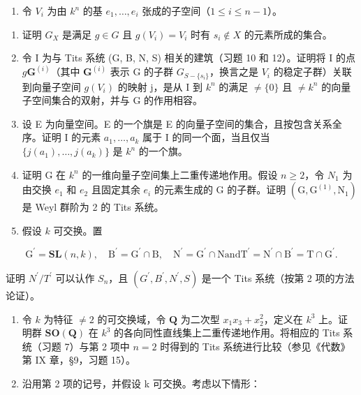 \begin{enumerate}
\def\labelenumi{(\arabic{enumi})}
\setcounter{enumi}{17}
\tightlist
\item
  令 \(V_i\) 为由 \(k^n\) 的基 \(e_1, \ldots, e_i\) 张成的子空间（\(1 \leqslant i \leqslant n - 1\)）。
\end{enumerate}

\begin{enumerate}
\def\labelenumi{\alph{enumi})}
\item
  证明 \(G_{X}\) 是满足 \(g \in G\) 且 \(g(V_{i}) = V_{i}\) 时有 \(s_{i} \notin X\) 的元素所成的集合。
\item
  令 I 为与 Tits 系统 (G, B, N, S) 相关的建筑（习题 10 和 12）。证明将 I 的点 \(g\mathbf{G}^{(i)}\)（其中 \(\mathbf{G}^{(i)}\) 表示 G 的子群 \(G_{S-\{s_i\}}\)，换言之是 \(V_i\) 的稳定子群）关联到向量子空间 \(g(V_i)\) 的映射 j，是从 I 到 \(k^n\) 的满足 \(\neq \{0\}\) 且 \(\neq k^n\) 的向量子空间集合的双射，并与 G 的作用相容。
\item
  设 E 为向量空间。E 的一个旗是 E 的向量子空间的集合，且按包含关系全序。证明 I 的元素 \(a_{1}, \ldots, a_{k}\) 属于 I 的同一个面，当且仅当 \(\{j(a_{1}), \ldots, j(a_{k})\}\) 是 \(k^{n}\) 的一个旗。
\item
  证明 G 在 \(k^{n}\) 的一维向量子空间集上二重传递地作用。假设 \(n \geqslant 2\)，令 \(N_{1}\) 为由交换 \(e_{1}\) 和 \(e_{2}\) 且固定其余 \(e_{i}\) 的元素生成的 G 的子群。证明 \((\mathrm{G}, \mathrm{G}^{(1)}, \mathrm{N}_{1})\) 是 Weyl 群阶为 2 的 Tits 系统。
\item
  假设 \(k\) 可交换。置
\end{enumerate}

\[
\mathrm{G} ^ {\prime} = \mathbf {S L} (n, k), \quad \mathrm{B} ^ {\prime} = \mathrm{G} ^ {\prime} \cap \mathrm{B}, \quad \mathrm{N} ^ {\prime} = \mathrm{G} ^ {\prime} \cap \mathrm{N} \text {and} \mathrm{T} ^ {\prime} = \mathrm{N} ^ {\prime} \cap \mathrm{B} ^ {\prime} = \mathrm{T} \cap \mathrm{G} ^ {\prime}.
\]

证明 \(N^{\prime}/T^{\prime}\) 可以认作 \(S_{n}\)，且 \((G^{\prime}, B^{\prime}, N^{\prime}, S)\) 是一个 Tits 系统（按第 2 项的方法论证）。

\begin{enumerate}
\def\labelenumi{\arabic{enumi})}
\setcounter{enumi}{18}
\item
  令 \(k\) 为特征 \(\neq 2\) 的可交换域，令 \(\mathbf{Q}\) 为二次型 \(x_{1}x_{3} + x_{2}^{2}\)，定义在 \(k^{3}\) 上。证明群 \(\mathbf{SO}(\mathbf{Q})\) 在 \(k^{3}\) 的各向同性直线集上二重传递地作用。将相应的 Tits 系统（习题 7）与第 2 项中 \(n = 2\) 时得到的 Tits 系统进行比较（参见《代数》第 IX 章，§9，习题 15）。
\item
  沿用第 2 项的记号，并假设 k 可交换。考虑以下情形：
\end{enumerate}

